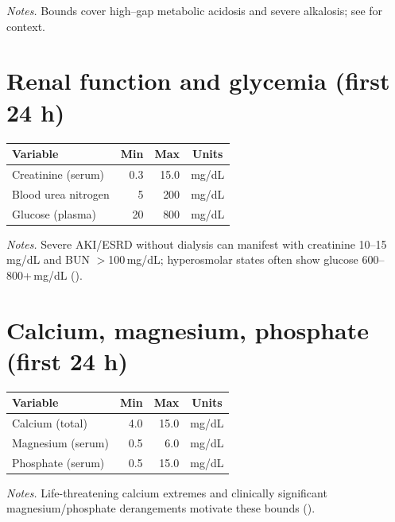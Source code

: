 \noindent\textit{Notes.} Bounds cover high–gap metabolic acidosis and severe alkalosis; see \citet{StatPearlsHAGMA,DKAGuideline} for context.

\vspace{0.75\baselineskip}
\section*{Renal function and glycemia (first 24 h)}
\vspace{0.75\baselineskip}
\begin{table}[ht!]\centering\small
\begin{tabular}{lrrc}
\toprule
\textbf{Variable} & \textbf{Min} & \textbf{Max} & \textbf{Units} \\
\midrule
Creatinine (serum) & 0.3 & 15.0 & mg/dL \\
Blood urea nitrogen & 5 & 200 & mg/dL \\
Glucose (plasma) & 20 & 800 & mg/dL \\
\bottomrule
\end{tabular}
\end{table}

\noindent\textit{Notes.} Severe AKI/ESRD without dialysis can manifest with creatinine 10–15\,mg/dL and BUN $>$100\,mg/dL; hyperosmolar states often show glucose 600–800+\,mg/dL (\citealt{ApolloCreatinine,MedNewsUremia,StatPearlsHHS}).

\vspace{0.75\baselineskip}
\section*{Calcium, magnesium, phosphate (first 24 h)}
\vspace{0.75\baselineskip}
\begin{table}[ht!]\centering\small
\begin{tabular}{lrrc}
\toprule
\textbf{Variable} & \textbf{Min} & \textbf{Max} & \textbf{Units} \\
\midrule
Calcium (total) & 4.0 & 15.0 & mg/dL \\
Magnesium (serum) & 0.5 & 6.0 & mg/dL \\
Phosphate (serum) & 0.5 & 15.0 & mg/dL \\
\bottomrule
\end{tabular}
\end{table}

\noindent\textit{Notes.} Life-threatening calcium extremes and clinically significant magnesium/phosphate derangements motivate these bounds (\citealt{MerckHypocalcemia,HypercalcemiaReview}).

